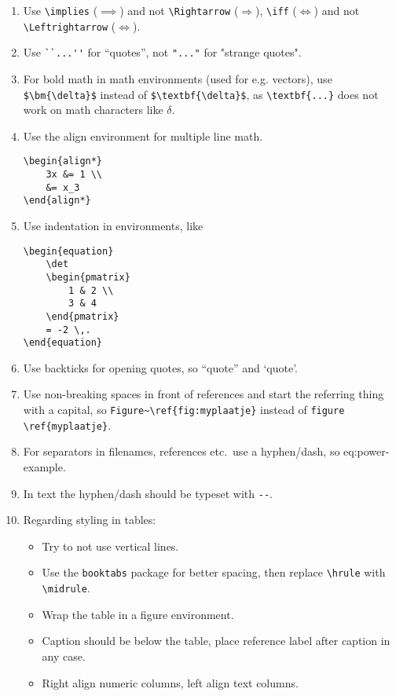 \documentclass[11pt]{article}
\begin{document}
\begin{enumerate}
        \item Use \verb|\implies| ($\implies$) and not \verb|\Rightarrow| ($\Rightarrow$), \verb|\iff| ($\iff$) and not \verb|\Leftrightarrow| ($\Leftrightarrow$).

        \item Use \verb|``...''| for ``quotes'', not \verb|"..."| for "strange quotes".

        \item For bold math in math environments (used for e.g. vectors), use \verb|$\bm{\delta}$| instead of \verb|$\textbf{\delta}$|, as        \verb|\textbf{...}| does not work on math characters like $\delta$.

        \item Use the align environment for multiple line math.
            \begin{lstlisting}
\begin{align*}
    3x &= 1 \\
    &= x_3
\end{align*}
            \end{lstlisting}

        \item Use indentation in environments, like
            \begin{lstlisting}
\begin{equation}
    \det
    \begin{pmatrix}
        1 & 2 \\
        3 & 4
    \end{pmatrix}
    = -2 \,.
\end{equation}
            \end{lstlisting}
        \item Use backticks for opening quotes, so ``quote'' and `quote'.
        \item Use non-breaking spaces in front of references and start the referring thing with a capital, so \verb|Figure~\ref{fig:myplaatje}| instead of \verb|figure \ref{myplaatje}|.
        \item For separators in filenames, references etc.\ use a hyphen/dash, so eq:power-example.
        \item In text the hyphen/dash should be typeset with \verb|--|.
        \item Regarding styling in tables:
        \begin{itemize}
            \item Try to not use vertical lines.
            \item Use the \verb|booktabs| package for better spacing, then replace \verb|\hrule| with \verb|\midrule|.
            \item Wrap the table in a figure environment.
            \item Caption should be below the table, place reference label after caption in any case.
            \item Right align numeric columns, left align text columns.
        \end{itemize}
    \end{enumerate}
\end{document}
